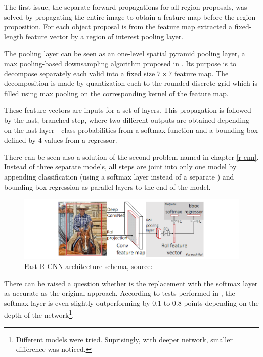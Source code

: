 The first issue, the separate forward propagations for all region proposals, was 
solved by propagating the entire image to obtain a feature map before the region 
proposition. For each object proposal is from the feature map extracted a 
fixed-length feature vector by a region of interest  pooling layer.

The  pooling layer can be seen as an one-level spatial pyramid pooling 
layer, a max pooling-based downsampling algorithm proposed in \cite{spp}. Its 
purpose is to decompose separately each valid  into a fixed size $7 
\times 7$ feature map. The decomposition is made by quantization each  
to the rounded discrete grid which is filled using max pooling on the 
corresponding kernel of the feature map.

These feature vectors are inputs for a set of  layers. This propagation 
is followed by the last, branched step, where two different outputs are obtained 
depending on the last layer - class probabilities from a softmax function and a 
bounding box defined by 4 values from a regressor.

There can be seen also a solution of the second problem named in chapter 
\ref{r-cnn}. Instead of three separate models, all steps are joint into only one 
model by appending classification (using a softmax layer instead of a separate 
) and bounding box regression as parallel layers to the end of the 
model.

\begin{figure}[H]
   \centering
	\includegraphics[width=.9\linewidth]{./pictures/fastrcnn.png}
	\caption[Fast R-CNN architecture]{Fast R-CNN architecture schema, source: 
\cite{fast-rcnn}}
      \label{fig:fast-rcnn}
\end{figure}

There can be raised a question whether is the  replacement with the 
softmax layer as accurate as the original approach. According to tests performed 
in \cite{fast-rcnn}, the softmax layer is even slightly outperforming  
by 0.1 to 0.8  points depending on the depth of the 
network\footnote{Different models were tried. Suprisingly, with deeper network, 
smaller  difference was noticed.}.

